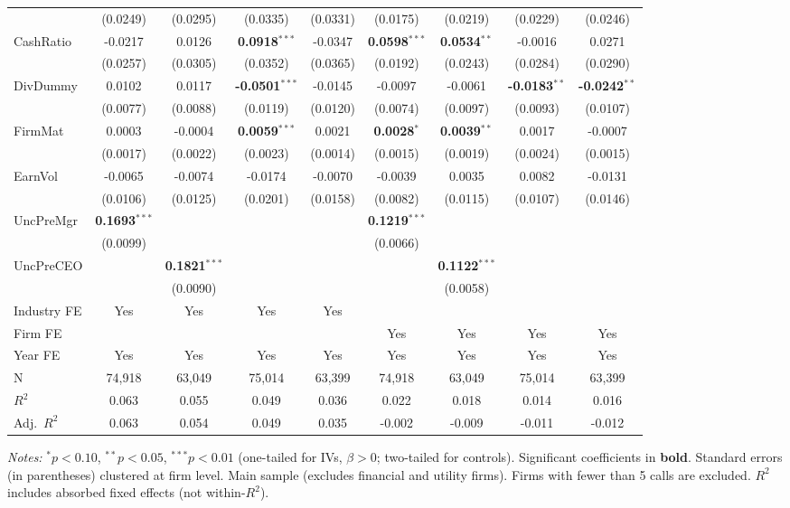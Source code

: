 \documentclass[11pt,a4paper]{article}
\begin{document}
\begin{table}[htbp]
\begin{tabular}{lcccccccc}
 & (0.0249) & (0.0295) & (0.0335) & (0.0331) & (0.0175) & (0.0219) & (0.0229) & (0.0246) \\
CashRatio & -0.0217 & 0.0126 & \textbf{0.0918}$^{***}$ & -0.0347 & \textbf{0.0598}$^{***}$ & \textbf{0.0534}$^{**}$ & -0.0016 & 0.0271 \\
 & (0.0257) & (0.0305) & (0.0352) & (0.0365) & (0.0192) & (0.0243) & (0.0284) & (0.0290) \\
DivDummy & 0.0102 & 0.0117 & \textbf{-0.0501}$^{***}$ & -0.0145 & -0.0097 & -0.0061 & \textbf{-0.0183}$^{**}$ & \textbf{-0.0242}$^{**}$ \\
 & (0.0077) & (0.0088) & (0.0119) & (0.0120) & (0.0074) & (0.0097) & (0.0093) & (0.0107) \\
FirmMat & 0.0003 & -0.0004 & \textbf{0.0059}$^{***}$ & 0.0021 & \textbf{0.0028}$^{*}$ & \textbf{0.0039}$^{**}$ & 0.0017 & -0.0007 \\
 & (0.0017) & (0.0022) & (0.0023) & (0.0014) & (0.0015) & (0.0019) & (0.0024) & (0.0015) \\
EarnVol & -0.0065 & -0.0074 & -0.0174 & -0.0070 & -0.0039 & 0.0035 & 0.0082 & -0.0131 \\
 & (0.0106) & (0.0125) & (0.0201) & (0.0158) & (0.0082) & (0.0115) & (0.0107) & (0.0146) \\
UncPreMgr & \textbf{0.1693}$^{***}$ &  &  &  & \textbf{0.1219}$^{***}$ &  &  &  \\
 & (0.0099) &  &  &  & (0.0066) &  &  &  \\
UncPreCEO &  & \textbf{0.1821}$^{***}$ &  &  &  & \textbf{0.1122}$^{***}$ &  &  \\
 &  & (0.0090) &  &  &  & (0.0058) &  &  \\
\midrule
Industry FE & Yes & Yes & Yes & Yes &  &  &  &  \\
Firm FE &  &  &  &  & Yes & Yes & Yes & Yes \\
Year FE & Yes & Yes & Yes & Yes & Yes & Yes & Yes & Yes \\
\midrule
N & 74,918 & 63,049 & 75,014 & 63,399 & 74,918 & 63,049 & 75,014 & 63,399 \\
$R^2$ & 0.063 & 0.055 & 0.049 & 0.036 & 0.022 & 0.018 & 0.014 & 0.016 \\
Adj.~$R^2$ & 0.063 & 0.054 & 0.049 & 0.035 & -0.002 & -0.009 & -0.011 & -0.012 \\
\bottomrule
\end{tabular}
\begin{minipage}{\linewidth}
\vspace{2pt}\scriptsize
\textit{Notes:} $^{*}p<0.10$, $^{**}p<0.05$, $^{***}p<0.01$ (one-tailed for IVs, $\beta > 0$; two-tailed for controls).
 Significant coefficients in \textbf{bold}.
 Standard errors (in parentheses) clustered at firm level.
 Main sample (excludes financial and utility firms). Firms with fewer than 5 calls are excluded.
 $R^2$ includes absorbed fixed effects (not within-$R^2$).
\end{minipage}
\end{table}
\end{document}
